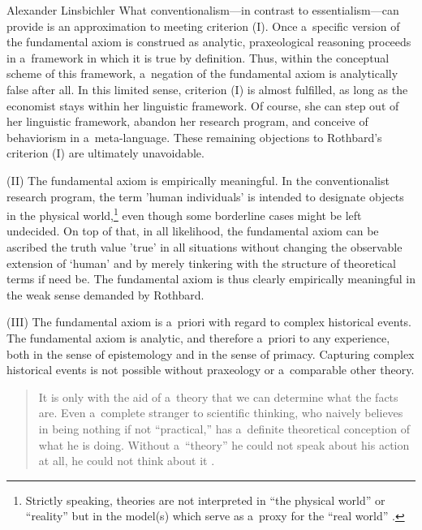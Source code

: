 \begin{artengenv}{Alexander Linsbichler}
What conventionalism---in contrast to essentialism---can provide is an approximation to meeting criterion (I). Once a~specific version of the fundamental axiom is construed as analytic, praxeological reasoning proceeds in a~framework in which it is true by definition. Thus, within the conceptual scheme of this framework, a~negation of the fundamental axiom is analytically false after all. In this limited sense, criterion (I) is almost fulfilled, as long as the economist stays within her linguistic framework. Of course, she can step out of her linguistic framework, abandon her research program, and conceive of behaviorism in a~meta-language. These remaining objections to Rothbard's criterion (I) are ultimately unavoidable.

\medskip

\noindent (II) The fundamental axiom is empirically meaningful. In the conventionalist research program, the term 'human individuals' is intended to designate objects in the physical world,\footnote{Strictly speaking, theories are not interpreted in ``the physical world'' or ``reality'' but in the model(s) which serve as a~proxy for the ``real world'' 
\parencites[cf.][]{linsbichler_ultra-refined_2023}[][]{przelecki_logic_1969}.%
} even though some borderline cases might be left undecided. On top of that, in all likelihood, the fundamental axiom can be ascribed the truth value 'true' in all situations without changing the observable extension of ‘human' and by merely tinkering with the structure of theoretical terms if need be. The fundamental axiom is thus clearly empirically meaningful in the weak sense demanded by Rothbard.

\medskip

\noindent (III) The fundamental axiom is a~priori with regard to complex historical events. The fundamental axiom is analytic, and therefore a~priori to any experience, both in the sense of epistemology and in the sense of primacy. Capturing complex historical events is not possible without praxeology or a~comparable other theory.



\begin{quote}
It is only with the aid of a~theory that we can determine what the facts are. Even a~complete stranger to scientific thinking, who naively believes in being nothing if not ``practical,'' has a~definite theoretical conception of what he is doing. Without a~``theory'' he could not speak about his action at all, he could not think about it 
\parencite[][p.29]{mises_epistemological_2003}.%
\end{quote}



\end{artengenv}
